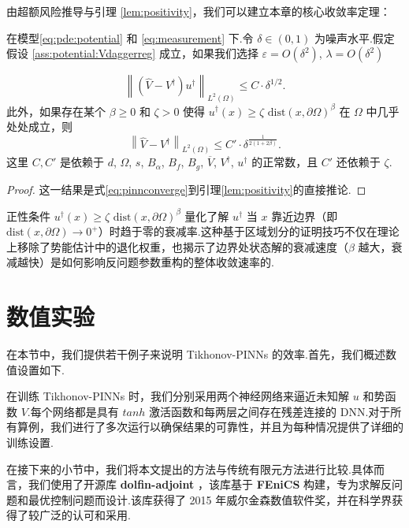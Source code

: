 由超额风险推导与引理 \ref{lem:positivity}，我们可以建立本章的核心收敛率定理：
\begin{theorem} \label{thm:ConvergenceRate}
在模型\eqref{eq:pde:potential} 和 \eqref{eq:measurement} 下.令 $\delta \in (0,1)$ 为噪声水平.假定假设 \ref{ass:potential:Vdaggerreg} 成立，如果我们选择 $\varepsilon = O(\delta^2)$, $\lambda = O(\delta^2)$

$$\left\lVert (\hat{V}-V^{\dagger})u^{\dagger} \right\rVert_{L^{2}(\Omega)} \leq C \cdot \delta^{1/2}.$$
此外，如果存在某个 $\beta \geq 0$ 和 $\zeta > 0$ 使得 $u^{\dagger}(x) \geq \zeta \text{ dist}(x,\partial\Omega)^{\beta}$ 在 $\Omega$ 中几乎处处成立，则
$$\left\lVert \hat{V}-V^{\dagger} \right\rVert_{L^{2}(\Omega)} \leq C' \cdot \delta^{\frac{1}{2(1 + 2\beta)}} .$$
这里 $C,C'$ 是依赖于 $d$, $\Omega$, $s$, $B_{\alpha}$, $B_{f}$, $B_{g}$, $\overline{V}$, $V^{\dagger}$, $u^{\dagger}$ 的正常数，且 $C'$ 还依赖于 $\zeta$.
\end{theorem}
\begin{proof}
这一结果是式\ref{eq:pinnconverge}到引理\ref{lem:positivity}的直接推论.
\end{proof}

\begin{remark}[正性条件]
正性条件 $u^{\dagger}(x) \geq \zeta \text{ dist}(x,\partial\Omega)^{\beta}$ 量化了解 $u^{\dagger}$ 当 $x$ 靠近边界（即 $\text{dist}(x,\partial\Omega) \to 0^{+}$）时趋于零的衰减率.这种基于区域划分的证明技巧不仅在理论上移除了势能估计中的退化权重，也揭示了边界处状态解的衰减速度（$\beta$ 越大，衰减越快）是如何影响反问题参数重构的整体收敛速率的.
\end{remark}

\section{数值实验}\label{sec:numerical}
在本节中，我们提供若干例子来说明 Tikhonov-PINNs 的效率.首先，我们概述数值设置如下.

在训练 Tikhonov-PINNs 时，我们分别采用两个神经网络来逼近未知解 $u$ 和势函数 $V$.每个网络都是具有 $tanh$ 激活函数和每两层之间存在残差连接的 DNN.对于所有算例，我们进行了多次运行以确保结果的可靠性，并且为每种情况提供了详细的训练设置.

在接下来的小节中，我们将本文提出的方法与传统有限元方法进行比较.具体而言，我们使用了开源库 \textbf{dolfin-adjoint} \cite{mitusch2019dolfin}，该库基于 \textbf{FEniCS} \cite{alnaes2015fenics,grossmann2024can} 构建，专为求解反问题和最优控制问题而设计.该库获得了 2015 年威尔金森数值软件奖，并在科学界获得了较广泛的认可和采用.

